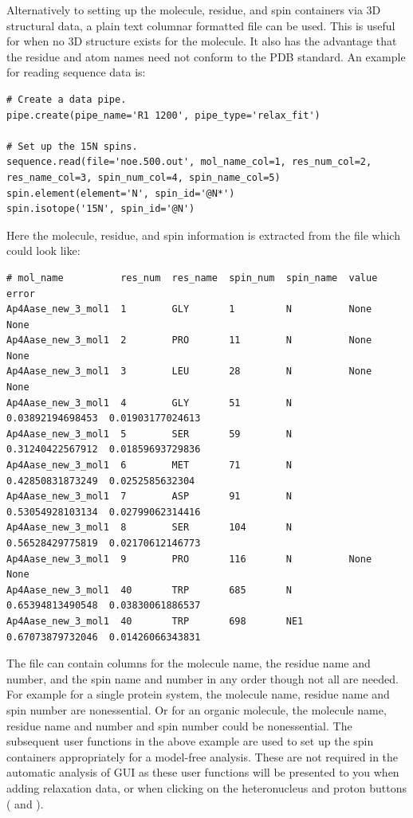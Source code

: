 Alternatively to setting up the molecule, residue, and spin containers via 3D structural data, a plain text columnar formatted file can be used.  This is useful for when no 3D structure exists for the molecule.  It also has the advantage that the residue and atom names need not conform to the PDB standard.  An example for reading sequence data is:

\begin{lstlisting}
# Create a data pipe.
pipe.create(pipe_name='R1 1200', pipe_type='relax_fit')

# Set up the 15N spins.
sequence.read(file='noe.500.out', mol_name_col=1, res_num_col=2, res_name_col=3, spin_num_col=4, spin_name_col=5)
spin.element(element='N', spin_id='@N*')
spin.isotope('15N', spin_id='@N')
\end{lstlisting}

Here the molecule, residue, and spin information is extracted from the  file which could look like:

{\scriptsize \begin{verbatim}
# mol_name          res_num  res_name  spin_num  spin_name  value             error               
Ap4Aase_new_3_mol1  1        GLY       1         N          None              None                
Ap4Aase_new_3_mol1  2        PRO       11        N          None              None                
Ap4Aase_new_3_mol1  3        LEU       28        N          None              None                
Ap4Aase_new_3_mol1  4        GLY       51        N          0.03892194698453  0.01903177024613    
Ap4Aase_new_3_mol1  5        SER       59        N          0.31240422567912  0.01859693729836    
Ap4Aase_new_3_mol1  6        MET       71        N          0.42850831873249  0.0252585632304     
Ap4Aase_new_3_mol1  7        ASP       91        N          0.53054928103134  0.02799062314416    
Ap4Aase_new_3_mol1  8        SER       104       N          0.56528429775819  0.02170612146773    
Ap4Aase_new_3_mol1  9        PRO       116       N          None              None                
Ap4Aase_new_3_mol1  40       TRP       685       N          0.65394813490548  0.03830061886537    
Ap4Aase_new_3_mol1  40       TRP       698       NE1        0.67073879732046  0.01426066343831    
\end{verbatim}} \label{verb: noe.500.out}

The file can contain columns for the molecule name, the residue name and number, and the spin name and number in any order though not all are needed.  For example for a single protein system, the molecule name, residue name and spin number are nonessential.  Or for an organic molecule, the molecule name, residue name and number and spin number could be nonessential.  The subsequent user functions in the above example are used to set up the spin containers appropriately for a model-free analysis.  These are not required in the automatic analysis of GUI as these user functions will be presented to you when adding relaxation data, or when clicking on the heteronucleus and proton buttons ( and ).

